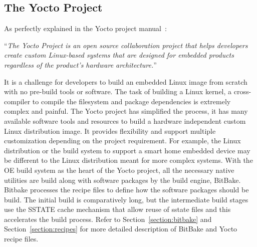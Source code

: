 \subsection{The Yocto Project}

As perfectly explained in the Yocto project manual~\parencite{Reference2}:
\vspace{0.5cm}


\enquote{\emph{The Yocto Project is an open source collaboration project that helps developers create custom Linux-based systems that are designed for embedded products regardless of the product’s hardware architecture.}}
\vspace{0.5cm}

It is a challenge for developers to build an embedded Linux image from scratch with no pre-build tools or software. The task of building a Linux kernel, a cross-compiler to compile the filesystem and package dependencies is extremely complex and painful. The Yocto project has simplified the process, it has many available software tools and resources to build a hardware independent custom Linux distribution image. It provides flexibility and support multiple customization depending on the project requirement. For example, the Linux distribution or the build system to support a smart home embedded device may be different to the Linux distribution meant for more complex systems. With the \ac{OE} build system as the heart of the Yocto project, all the necessary native utilities are build along with software packages by the build engine, BitBake. Bitbake processes the recipe files to define how the software packages should be build. The initial build is comparatively long, but the intermediate build stages use the \ac{SSTATE} cache mechanism that allow reuse of sstate files and this accelerates the build process. Refer to Section~\ref{section:bitbake} and Section~\ref{section:recipes} for more detailed description of BitBake and Yocto recipe files.


